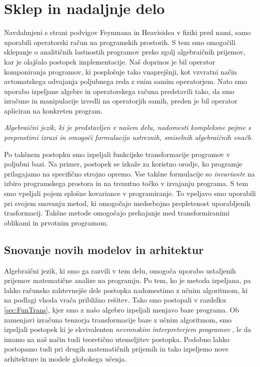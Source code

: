 \documentclass[a4paper, 12pt]{book}
\begin{document}
\chapter{Sklep in nadaljnje delo} \label{ch:zakSklp}

Navdahnjeni s strani podvigov Feynmana \cite{Feynman} in Heavisidea \cite{HeavisideOperational} v fiziki pred nami, samo uporabili operatorski račun na programskih prostorih. S tem smo omogočili sklepanje o analitičnih lastnostih programov preko zgolj algebraičnih prijemov, kar je olajšalo postopek implementacije. Naš doprinos je bil operator komponiranja programov, ki posplošuje tako vnaprejšnji, kot vzvratni način avtomatskega odvajanja poljubnega reda z enim samim operatorjem. Nato smo uporabo izpeljane algebre in operatorskega računa predstavili tako, da smo izračune in manipulacije izvedli na operatorjih samih, preden je bil operator apliciran na konkreten program. 

\emph{Algebraični jezik, ki je predstavljen v našem delu, nadomesti kompleksne pojme s preprostimi izrazi in omogoči formulacijo ustreznih, smiselnih algebraičnih enačb.} 

Po takšnem postopku smo izpeljali funkcijske transformacije programov v poljubni bazi. Na primer, postopek se izkaže za koristno orodje, ko programje prilagajamo na specifično strojno opremo. Vse takšne formulacije so \emph{invariante} na izbiro programskega prostora in na trenutno točko v izvajanju programa. S tem smo vpeljali pojem splošne kovariance v programiranje. To vpeljavo smo uporabili pri svojem snovanju metod, ki omogočajo medsebojno prepletenost uporabljenih trasformacij. Takšne metode omogočajo prehajanje med transformiranimi oblikami in prvotnim programom.

\section{Snovanje novih modelov in arhitektur}

Algebraični jezik, ki smo ga razvili v tem delu, omogoča uporabo ustaljenih prijemov matematične analize na programju. Po tem, ko je metoda izpeljana, pa lahko računsko zahtevnejše dele postopka nadomestimo z učnim algoritmom, ki na podlagi vhoda vrača približno rešitev. Tako smo postopali v razdelku \ref{sec:FunTrans}, kjer smo z našo algebro izpeljali menjavo baze programa. Ob zamenjavi izračuna tenzorja transformacije baze z učnim algoritmom, smo izpeljali postopek ki je ekvivalenten \emph{nevronskim interpreterjem programov} \cite{progInterp}, le da imamo na naš način tudi teoretično utemeljitev postopka. Podobno lahko postopamo tudi pri drugih matematičnih prijemih in tako izpeljemo nove arhitekture in modele globokega učenja.
\end{document}
